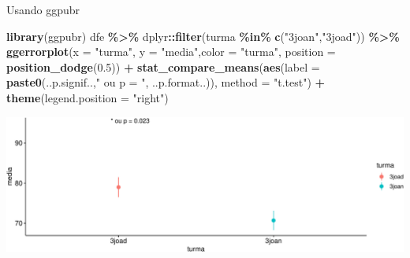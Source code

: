 \documentclass[
  9pt,
  ignorenonframetext,
  aspectratio=169]{beamer}
\newenvironment{Shaded}{\begin{snugshade}}{\end{snugshade}}
\newcommand{\DataTypeTok}[1]{\textcolor[rgb]{0.13,0.29,0.53}{#1}}
\newcommand{\FloatTok}[1]{\textcolor[rgb]{0.00,0.00,0.81}{#1}}
\newcommand{\KeywordTok}[1]{\textcolor[rgb]{0.13,0.29,0.53}{\textbf{#1}}}
\newcommand{\NormalTok}[1]{#1}
\newcommand{\OperatorTok}[1]{\textcolor[rgb]{0.81,0.36,0.00}{\textbf{#1}}}
\newcommand{\StringTok}[1]{\textcolor[rgb]{0.31,0.60,0.02}{#1}}
\begin{document}
\begin{frame}[fragile]{Usando ggpubr}
\protect\hypertarget{usando-ggpubr}{}
\begin{Shaded}
\begin{Highlighting}[]
\KeywordTok{library}\NormalTok{(ggpubr)}
\NormalTok{dfe }\OperatorTok{\%\textgreater{}\%}\StringTok{ }\NormalTok{dplyr}\OperatorTok{::}\KeywordTok{filter}\NormalTok{(turma }\OperatorTok{\%in\%}\StringTok{ }\KeywordTok{c}\NormalTok{(}\StringTok{"3joan"}\NormalTok{,}\StringTok{"3joad"}\NormalTok{)) }\OperatorTok{\%\textgreater{}\%}\StringTok{ }
\StringTok{  }\KeywordTok{ggerrorplot}\NormalTok{(}\DataTypeTok{x =} \StringTok{"turma"}\NormalTok{, }\DataTypeTok{y =} \StringTok{"media"}\NormalTok{,}\DataTypeTok{color =} \StringTok{"turma"}\NormalTok{,}
              \DataTypeTok{position =} \KeywordTok{position\_dodge}\NormalTok{(}\FloatTok{0.5}\NormalTok{)) }\OperatorTok{+}
\StringTok{  }\KeywordTok{stat\_compare\_means}\NormalTok{(}\KeywordTok{aes}\NormalTok{(}\DataTypeTok{label =} \KeywordTok{paste0}\NormalTok{(..p.signif..,}\StringTok{" ou p = "}\NormalTok{, ..p.format..)),}
                     \DataTypeTok{method =} \StringTok{"t.test"}\NormalTok{) }\OperatorTok{+}\StringTok{ }\KeywordTok{theme}\NormalTok{(}\DataTypeTok{legend.position =} \StringTok{"right"}\NormalTok{)}
\end{Highlighting}
\end{Shaded}

\includegraphics{aula_11_files/figure-beamer/unnamed-chunk-9-1.pdf}
\end{frame}
\end{document}
